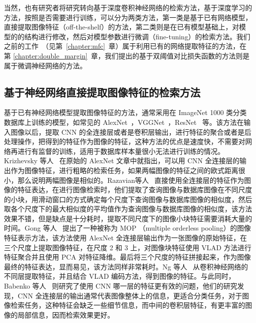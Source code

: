 当然，也有研究者将研究转向基于深度卷积神经网络的检索方法，基于深度学习的方法，按照是否需要进行训练，可以分为两类方法，第一类是基于已有网络模型，直接提取图像特征（off-the-shelf）的方法，第二类则是在已有模型基础上，对模型的的结构进行修改，然后对模型参数进行微调（fine-tuning）的检索方法。我们之前的工作~\cite{Hao2017MFCAM}（见第~\ref{chapter:mfc}~章）属于利用已有的网络提取特征的方法，在第 \ref{chapter:double_margin}~章，我们提出的基于双阈值对比损失函数的方法则是属于微调神经网络的方法。

\subsection{基于神经网络直接提取图像特征的检索方法}

基于已有神经网络模型提取图像特征的方法，通常采用在 ImageNet 1000 类分类数据库上训练的模型，如常见的 AlexNet~\cite{Krizhevsky2012ImageNetCW}，VGGNet~\cite{Simonyan2014VeryDC}，ResNet~\cite{He2016DeepRL} 等。该方法在输入图像以后，提取 CNN 的全连接层或者是卷积层输出，进行特征的聚合或者是后处理操作，把得到的特征作为图像的特征，这种方法的优点是速度快，不需要对网络再进行有监督的训练，适用于数据库样本量很小无法进行训练的情况。Krizhevsky 等人~\cite{Krizhevsky2012ImageNetCW} 在原始的 AlexNet 文章中就指出，可以用 CNN 全连接层的输出作为图像特征，进行粗略的检索任务，如果两幅图像的特征之间的欧式距离很小，那么说明两幅图像是相似的。Razavian等人~\cite{Razavian2014CNNFO} 直接使用全连接层的特征作为图像的特征表达，在进行图像检索时，他们提取了查询图像与数据库图像在不同尺度的小块，用滑动窗口的方式确定每个尺度下查询图像与数据库图像的相似度，然后取各个尺度下的最大相似度的平均值作为查询图像与数据库图像的相似度，该方法效果不错，但是缺点是十分耗时，提取不同尺度下的图像小块特征需要消耗大量的时间。Gong 等人~\cite{Gong2014MultiscaleOP} 提出了一种被称为 MOP （multiple orderless pooling）的图像特征表示方法，该方法使用 AlexNet 全连接层输出作为一张图像的原始特征，在三个尺度上提取图像特征，在尺度 2 和 3 上，对图像块特征使用 VLAD 方法进行特征聚合并且使用 PCA 对特征降维。最后将三个尺度的特征拼接起来，作为图像最终的特征表达，显而易见，该方法同样非常耗时。Ng 等人~\cite{Ng2015ExploitingLF} 从卷积神经网络的不同层提取特征，并且结合 VLAD 编码方法，得到图像的特征。与此同时，Babenko 等人~\cite{Babenko2014NeuralCF} 则研究了使用 CNN 哪一层的特征更有效的问题，他们的研究发现，CNN 全连接层的输出通常代表图像整体上的信息，更适合分类任务，对于图像检索任务，这种特征会缺乏一些细节信息，而中间的卷积层特征，有更丰富的图像的局部信息，因而检索效果更好。

